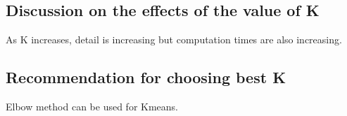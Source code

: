 \documentclass[conference]{IEEEtran}
\begin{document}
    \subsection{Discussion on the effects of the value of K}

    As K increases, detail is increasing but computation times are also increasing.

    \subsection{Recommendation for choosing best K}

    Elbow method can be used for Kmeans.
\end{document}

